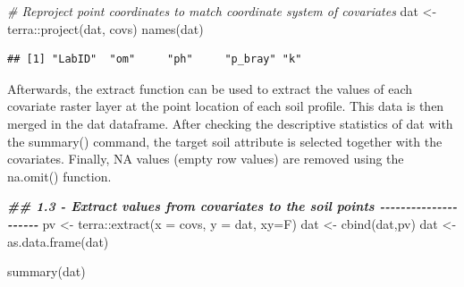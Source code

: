 \documentclass[
  10pt,
  b5paper,
  oneside]{book}
\newenvironment{Shaded}{\begin{snugshade}}{\end{snugshade}}
\newcommand{\AttributeTok}[1]{\textcolor[rgb]{0.77,0.63,0.00}{#1}}
\newcommand{\CommentTok}[1]{\textcolor[rgb]{0.56,0.35,0.01}{\textit{#1}}}
\newcommand{\DocumentationTok}[1]{\textcolor[rgb]{0.56,0.35,0.01}{\textbf{\textit{#1}}}}
\newcommand{\FunctionTok}[1]{\textcolor[rgb]{0.00,0.00,0.00}{#1}}
\newcommand{\NormalTok}[1]{#1}
\newcommand{\OtherTok}[1]{\textcolor[rgb]{0.56,0.35,0.01}{#1}}
\newcommand{\SpecialCharTok}[1]{\textcolor[rgb]{0.00,0.00,0.00}{#1}}
\begin{document}
\begin{Shaded}
\begin{Highlighting}[]
\CommentTok{\# Reproject point coordinates to match coordinate system of covariates}
\NormalTok{dat }\OtherTok{\textless{}{-}}\NormalTok{ terra}\SpecialCharTok{::}\FunctionTok{project}\NormalTok{(dat, covs)}
\FunctionTok{names}\NormalTok{(dat)}
\end{Highlighting}
\end{Shaded}

\begin{verbatim}
## [1] "LabID"  "om"     "ph"     "p_bray" "k"
\end{verbatim}

Afterwards, the extract function can be used to extract the values of each covariate raster layer at the point location of each soil profile. This data is then merged in the dat dataframe. After checking the descriptive statistics of dat with the summary() command, the target soil attribute is selected together with the covariates. Finally, NA values (empty row values) are removed using the na.omit() function.

\begin{Shaded}
\begin{Highlighting}[]
\DocumentationTok{\#\# 1.3 {-} Extract values from covariates to the soil points {-}{-}{-}{-}{-}{-}{-}{-}{-}{-}{-}{-}{-}{-}{-}{-}{-}{-}{-}{-}{-}}
\NormalTok{pv }\OtherTok{\textless{}{-}}\NormalTok{ terra}\SpecialCharTok{::}\FunctionTok{extract}\NormalTok{(}\AttributeTok{x =}\NormalTok{ covs, }\AttributeTok{y =}\NormalTok{ dat, }\AttributeTok{xy=}\NormalTok{F)}
\NormalTok{dat }\OtherTok{\textless{}{-}} \FunctionTok{cbind}\NormalTok{(dat,pv)}
\NormalTok{dat }\OtherTok{\textless{}{-}} \FunctionTok{as.data.frame}\NormalTok{(dat)}

\FunctionTok{summary}\NormalTok{(dat)}
\end{Highlighting}
\end{Shaded}
\end{document}
